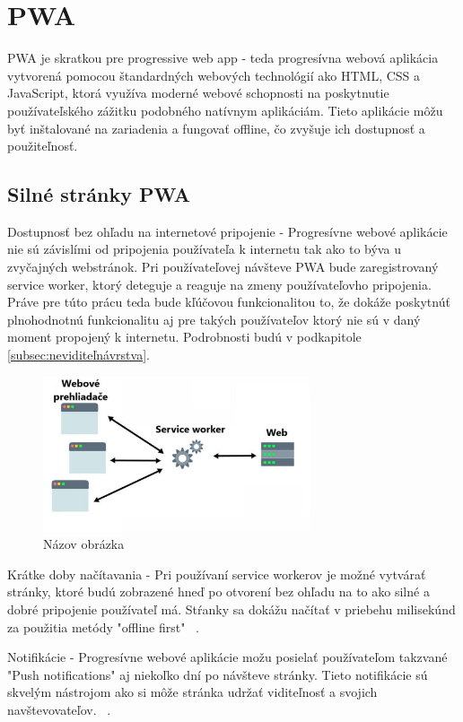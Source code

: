 \section{PWA}
PWA je skratkou pre progressive web app - teda progresívna webová aplikácia vytvorená pomocou štandardných webových technológií ako HTML, 
CSS a JavaScript, ktorá využíva moderné webové schopnosti na poskytnutie používateľského zážitku podobného natívnym aplikáciám. Tieto 
aplikácie môžu byť inštalované na zariadenia a fungovať offline, čo zvyšuje ich dostupnosť a použiteľnosť. 

\subsection{Silné stránky PWA}
Dostupnosť bez ohľadu na internetové pripojenie - Progresívne webové aplikácie nie sú závislími od pripojenia používateľa k internetu tak ako
to býva u zvyčajných webstránok. Pri používateľovej návšteve PWA bude zaregistrovaný service worker, ktorý deteguje a reaguje na
zmeny používateľovho pripojenia. Práve pre túto prácu teda bude kľúčovou funkcionalitou to, že dokáže poskytnúť plnohodnotnú funkcionalitu aj
pre takých používateľov ktorý nie sú v daný moment propojený k internetu. Podrobnosti budú v podkapitole \ref{subsec:neviditeľnávrstva}.

\begin{figure}[H]
  \centering
  \includegraphics[width=0.7\textwidth]{img/image1.pdf}
  \caption{Názov obrázka \cite{Ater2017BuildingPWA}}
  \label{fig:obrazok1}
\end{figure}

Krátke doby načítavania - Pri používaní service workerov je možné vytvárať stránky, ktoré budú zobrazené hneď po otvorení bez ohľadu na to
ako silné a dobré pripojenie používateľ má. Stŕanky sa dokážu načítať v priebehu milisekúnd za použitia metódy "offline first" ~\cite{Ater2017BuildingPWA}.

Notifikácie - Progresívne webové aplikácie možu posielať používateľom takzvané "Push notifications" aj niekoľko dní po návšteve stránky. Tieto
notifikácie sú skvelým nástrojom ako si môže stránka udržať viditeľnosť a svojich navštevovateľov. ~\cite{Ater2017BuildingPWA}.

